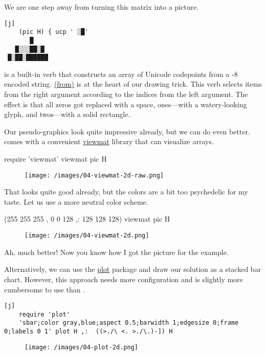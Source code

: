 \documentclass{article}
\begin{document}
We are one step away from turning this matrix into a picture.

\begin{verbatim}[j]
    (pic H) { ucp ' ░█'
       █    
   █░░░██░█ 
 █░██░██████
\end{verbatim}

 is a built-in verb that constructs an array of Unicode codepoints from a -8 encoded string.
\href{https://code.jsoftware.com/wiki/Vocabulary/curlylf#dyadic}{\code{\{} (from)} is at the heart of our drawing trick.
This verb selects items from the right argument according to the indices from the left argument.
The effect is that all zeros got replaced with a space, ones---with a watery-looking glyph, and twos---with a solid rectangle.

Our pseudo-graphics look quite impressive already, but we can do even better.
 comes with a convenient \href{https://code.jsoftware.com/wiki/Studio/Viewmat}{viewmat} library that can visualize arrays.

\begin{code}[j]
    require 'viewmat'
    viewmat pic H
\end{code}

\begin{figure}
   \texttt{[image: /images/04-viewmat-2d-raw.png]}
\end{figure}

That looks quite good already, but the colors are a bit too psychedelic for my taste.
Let us use a more neutral color scheme.

\begin{code}[j]
    (255 255 255 , 0 0 128 ,: 128 128 128) viewmat pic H
\end{code}

\begin{figure}
   \texttt{[image: /images/04-viewmat-2d.png]}
\end{figure}

Ah, much better!
Now you know how I got the picture for the example.

Alternatively, we can use the \href{https://code.jsoftware.com/wiki/Plot}{plot} package and draw our solution as a stacked bar chart.
However, this approach needs more configuration and is slightly more cumbersome to use than .

\begin{verbatim}[j]
    require 'plot'
    'sbar;color gray,blue;aspect 0.5;barwidth 1;edgesize 0;frame 0;labels 0 1' plot H ,:  ((>./\ <. >./\.)-]) H
\end{verbatim}
\begin{figure}
    \texttt{[image: /images/04-plot-2d.png]}
\end{figure}
\end{document}
